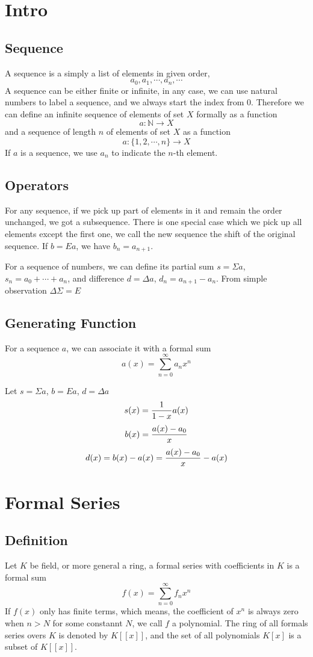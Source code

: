 \documentclass{article}
\begin{document}
\section{Intro}
\subsection{Sequence}
A sequence is a simply a list of elements in given order,
$$a_0, a_1, \cdots, a_n, \cdots$$
A sequence can be either finite or infinite,
in any case, we can use natural numbers to label a sequence,
and we always start the index from $0$.
Therefore we can define an infinite sequence of elements of set $X$ formally as a
function $$a : \mathbb N \to X$$
and a sequence of length $n$ of elements of set $X$ as a function
$$a : \{1, 2, \cdots, n\} \to X$$
If $a$ is a sequence, we use $a_n$ to indicate the $n$-th element.

\subsection{Operators}
For any sequence, if we pick up part of elements in it and remain the order unchanged,
we got a subsequence.
There is one special case which we pick up all elements except the first one,
we call the new sequence the shift of the original sequence.
If $b = Ea$, we have $b_n = a_{n+1}$.

For a sequence of numbers, we can define its partial sum $s = \Sigma a$,
$s_n = a_0 + \cdots + a_n$, and difference $d = \Delta a$, $d_n = a_{n+1} - a_n$.
From simple observation $\Delta \Sigma = E$

\subsection{Generating Function}
For a sequence $a$, we can associate it with a formal sum
$$a(x) = \sum_{n=0}^{\infty} a_n x^n$$

Let $s = \Sigma a$, $b = E a$, $d = \Delta a$
$$s(x) = {1 \over 1 - x} a(x)$$
$$b(x) = {a(x) - a_0 \over x}$$
$$d(x) = b(x) - a(x) = {a(x) - a_0 \over x} - a(x)$$


\section{Formal Series}
\subsection{Definition}
Let $K$ be field, or more general a ring, a formal series with coefficients in $K$ is a formal sum
$$f(x) = \sum_{n=0}^\infty f_n x^n$$
If $f(x)$ only has finite terms, which means,
the coefficient of $x^n$ is always zero when $n > N$
for some constannt $N$, we call $f$ a polynomial.
The ring of all formals series overs $K$ is denoted by $K[[x]]$,
and the set of all polynomials $K[x]$ is a subset of $K[[x]]$.
\end{document}
